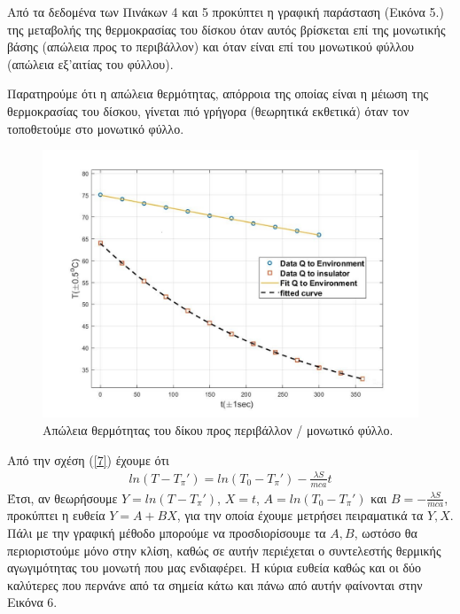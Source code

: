 \documentclass[a4paper]{article}
\begin{document}
Από τα δεδομένα των Πινάκων 4 και 5 προκύπτει η γραφική παράσταση (Εικόνα 5.) της μεταβολής της θερμοκρασίας του δίσκου όταν αυτός βρίσκεται επί της μονωτικής βάσης (απώλεια προς το περιβάλλον) και όταν είναι επί του μονωτικού φύλλου (απώλεια εξ'αιτίας του φύλλου). 

Παρατηρούμε ότι η απώλεια θερμότητας, απόρροια της οποίας είναι η μέιωση της θερμοκρασίας του δίσκου, γίνεται πιό γρήγορα (θεωρητικά εκθετικά) όταν τον τοποθετούμε στο μονωτικό φύλλο.

\newpage

\begin{figure}[h!]
\centering 
\caption{ Απώλεια θερμότητας του δίκου προς περιβάλλον / μονωτικό φύλλο.}
\includegraphics[scale=0.75]{insulator_heat.jpg}
\end{figure}

Από την σχέση (\ref{7}) έχουμε ότι 
\begin{align*}
ln(T-T_\pi') = ln(T_0- T_\pi') - \frac{\lambda S}{mca} t
\end{align*}
Έτσι, αν θεωρήσουμε $Y=ln(T-T_\pi')$, $X = t$, $A=ln(T_0-T_\pi')$ και $B=-\frac{\lambda S}{mca}$, προκύπτει η ευθεία $Y=A+BX$, για την οποία έχουμε μετρήσει πειραματικά τα $Y,X$. Πάλι με την γραφική μέθοδο μπορούμε να προσδιορίσουμε τα $A,B$, ωστόσο θα περιοριστούμε μόνο στην κλίση, καθώς σε αυτήν περιέχεται ο συντελεστής θερμικής αγωγιμότητας του μονωτή που μας ενδιαφέρει. Η κύρια ευθεία καθώς και οι δύο καλύτερες που περνάνε από τα σημεία κάτω και πάνω από αυτήν φαίνονται στην Εικόνα 6.
\end{document}
